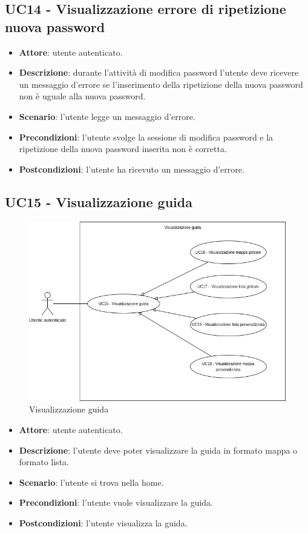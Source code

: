 \subsection{UC14 - Visualizzazione errore di ripetizione nuova password}
\begin{itemize}
    \item \textbf{Attore}: utente autenticato.
    \item \textbf{Descrizione}: durante l'attività di modifica password l'utente deve ricevere un messaggio d'errore se l'inserimento della ripetizione della nuova password non è uguale alla nuova password.
    \item \textbf{Scenario}: l'utente legge un messaggio d'errore. 
    \item \textbf{Precondizioni}: l'utente svolge la sessione di modifica password e la ripetizione della nuova password inserita non è corretta.
    \item \textbf{Postcondizioni}: l'utente ha ricevuto un messaggio d'errore.
\end{itemize}

\subsection{UC15 - Visualizzazione guida}

\begin{figure}[H]
    \includegraphics[width=13cm]{sezioni/Images/UC15.png}
    \centering
    \caption{Visualizzazione guida}
\end{figure}

\begin{itemize}
    \item \textbf{Attore}: utente autenticato.
    \item \textbf{Descrizione}: l'utente deve poter visualizzare la guida in formato mappa o formato lista.
    \item \textbf{Scenario}: l'utente si trova nella home.
    \item \textbf{Precondizioni}: l'utente vuole visualizzare la guida.
    \item \textbf{Postcondizioni}: l'utente visualizza la guida.
\end{itemize}

